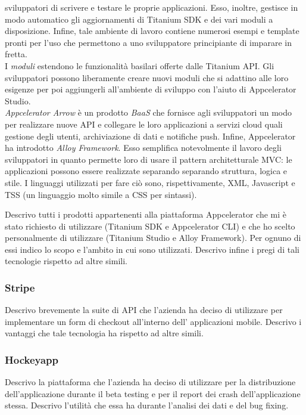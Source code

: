 				sviluppatori di scrivere e testare le proprie applicazioni. Esso, inoltre, gestisce in modo automatico gli
				aggiornamenti di Titanium SDK e dei vari moduli a disposizione. Infine, tale ambiente di lavoro contiene numerosi
				esempi e template pronti per l'uso che permettono a uno sviluppatore principiante di imparare in fretta.\\
				I \emph{moduli} estendono le funzionalità basilari offerte dalle Titanium API. Gli sviluppatori possono
				liberamente creare nuovi moduli che si adattino alle loro esigenze per poi aggiungerli all'ambiente di sviluppo con
				l'aiuto di Appcelerator Studio.\\
				\emph{Appcelerator Arrow} è un prodotto \emph{BaaS} che fornisce agli sviluppatori un modo per realizzare nuove API e
				collegare le loro applicazioni a servizi cloud quali gestione degli utenti, archiviazione di dati e notifiche push.
				Infine, Appcelerator ha introdotto \emph{Alloy Framework}. Esso semplifica notevolmente il lavoro degli sviluppatori
				in quanto permette loro di usare il pattern architetturale MVC: le applicazioni possono essere realizzate separando
				separando struttura, logica e stile. I linguaggi utilizzati per fare ciò sono, rispettivamente, XML, Javascript e TSS
				(un linguaggio molto simile a CSS per sintassi).
				
				Descrivo tutti i prodotti appartenenti alla piattaforma Appcelerator che mi è stato richiesto di utilizzare
				(Titanium SDK e Appcelerator CLI) e che ho scelto personalmente di utilizzare (Titanium Studio e Alloy Framework).
				Per ognuno di essi indico lo scopo e l'ambito in cui sono utilizzati. Descrivo infine i pregi di tali tecnologie
				rispetto ad altre simili.
			\subsubsection{Stripe}
				Descrivo brevemente la suite di API che l'azienda ha deciso di utilizzare per implementare un form di checkout
				all'interno dell' applicazioni mobile. Descrivo i vantaggi che tale tecnologia ha rispetto ad altre simili.
			\subsubsection{Hockeyapp}
				Descrivo la piattaforma che l'azienda ha deciso di utilizzare per la distribuzione dell'applicazione durante il
				beta testing e per il report dei crash dell'applicazione stessa. Descrivo l'utilità che essa ha durante l'analisi
				dei dati e del bug fixing.
